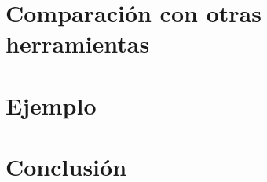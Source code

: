 \documentclass[12pt]{beamer}
\begin{document}
\section{Comparación con otras herramientas}
\begin{frame}
\end{frame}
\begin{comment}
\begin{frame}
  \frametitle{TLA+ vs Alloy}
      \begin{itemize}
	\item Concepto de modelado similar
	\item TLA+ es mucho mas expresivo que Alloy
	    \subitem Importancia en la práctica
	    \subitem Muchas especificaciones reales escritas en TLA+ son casi imposibles de escribir en Alloy

	\end{itemize}
  
\end{frame}

\begin{frame}
  \frametitle{herramientas similares a TLAPS}
        \begin{itemize}
	  \item Isar
	    \subitem Corre sobre Isabelle
	    \subitem Estilo de desarrollo diferente
	    \subitem Bueno para pruebas cortas pero no tanto para pruebas largas
	  \item Focal
	      \subitem Subconjunto de TLA+, que incluye el desarrollo de demostraciones jerárquicamente.
	  \item Coq
	      \subitem Corre sobre Zenon
	      \subitem Desarrollo semi-interactivo
	    

	\end{itemize}
\end{frame}
\end{comment}


\section{Ejemplo}
\begin{frame}
\end{frame}

\section{Conclusión}
\begin{frame}
\end{frame}
\end{document}
